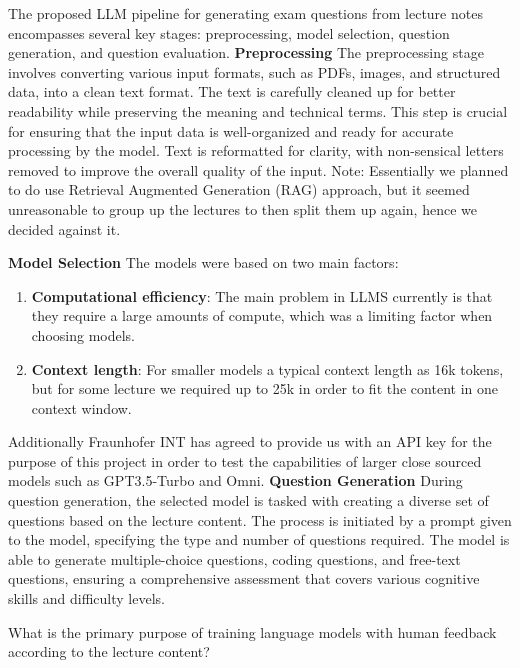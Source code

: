 

{
	The proposed LLM pipeline for generating exam questions from lecture notes encompasses several key stages: preprocessing, model selection, question generation, and question evaluation.
	\bigbreak
	\bigbreak
    \textbf{Preprocessing}
	The preprocessing stage involves converting various input formats, such as PDFs, images, and structured data, into a clean text format. The text is carefully cleaned up for better readability while preserving the meaning and technical terms. This step is crucial for ensuring that the input data is well-organized and ready for accurate processing by the model. Text is reformatted for clarity, with non-sensical letters removed to improve the overall quality of the input. Note: Essentially we planned to do use Retrieval Augmented Generation (RAG) approach, but it seemed unreasonable to group up the lectures to then split them up again, hence we decided against it.
	
	\bigbreak
	\bigbreak
 	\textbf{Model Selection}
 	The models were based on two main factors:
 	\begin{enumerate}
 		\item \textbf{Computational efficiency}: The main problem in LLMS currently is that they require a large amounts of compute, which was a limiting factor when choosing models.
 		\item \textbf{Context length}: For smaller models a typical context length as 16k tokens, but for some lecture we required up to 25k in order to fit the content in one context window.
 	\end{enumerate}
 	Additionally Fraunhofer INT has agreed to provide us with an API key for the purpose of this project in order to test the capabilities of larger close sourced models such as GPT3.5-Turbo and Omni.
    \bigbreak
    \bigbreak
    \textbf{Question Generation}
	During question generation, the selected model is tasked with creating a diverse set of questions based on the lecture content. The process is initiated by a prompt given to the model, specifying the type and number of questions required. The model is able to generate multiple-choice questions, coding questions, and free-text questions, ensuring a comprehensive assessment that covers various cognitive skills and difficulty levels.
	\begin{tcolorbox}[skin=widget,
		coltitle=black,
		colframe=brsu_blue!30,
		colback=brsu_blue!10,
  		adjusted title=Example multiple choice question:,
		boxrule=2mm]
	What is the primary purpose of training language models with human feedback according to the lecture content?
	\tcblower


\end{tcolorbox}}
